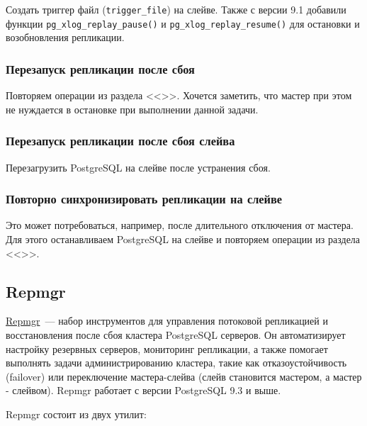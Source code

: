 Создать триггер файл (\lstinline!trigger_file!) на слейве. Также с версии 9.1 добавили функции \lstinline!pg_xlog_replay_pause()! и \lstinline!pg_xlog_replay_resume()! для остановки и возобновления репликации.

\subsubsection{Перезапуск репликации после сбоя}

Повторяем операции из раздела <<>>. Хочется заметить, что мастер при этом не нуждается в остановке при выполнении данной задачи.

\subsubsection{Перезапуск репликации после сбоя слейва}

Перезагрузить PostgreSQL на слейве после устранения сбоя.

\subsubsection{Повторно синхронизировать репликации на слейве}

Это может потребоваться, например, после длительного отключения от мастера. Для этого останавливаем PostgreSQL на слейве и повторяем операции из раздела <<>>.


\subsection{Repmgr}

\href{http://www.repmgr.org/}{Repmgr}~--- набор инструментов для управления потоковой репликацией и восстановления после сбоя кластера PostgreSQL серверов. Он автоматизирует настройку резервных серверов, мониторинг репликации, а также помогает выполнять задачи администрированию кластера, такие как отказоустойчивость (failover) или переключение мастера-слейва (слейв становится мастером, а мастер - слейвом). Repmgr работает с версии PostgreSQL 9.3 и выше.

Repmgr состоит из двух утилит:


